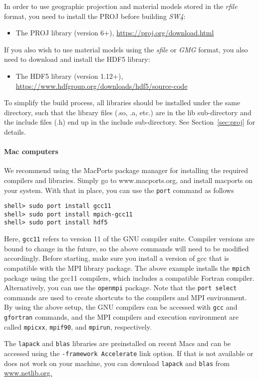 \documentclass[11pt]{article}
\begin{document}
In order to use geographic projection and material models stored in the \emph{rfile} format, you need to install the PROJ before building \emph{SW4}:
\begin{itemize}
\item The PROJ library (version 6+), \url{https://proj.org/download.html}
\end{itemize}  
If you also wish to use material models using the \emph{sfile} or \emph{GMG} format, you also need to download and install the HDF5 library:
\begin{itemize}
\item The HDF5 library (version 1.12+), \url{https://www.hdfgroup.org/downloads/hdf5/source-code}
\end{itemize}
To simplify the build process, all libraries should be installed under the same directory, such that the library files (.so, .a, etc.) are in the lib sub-directory and the include files (.h) end up in the include sub-directory. See Section~\ref{sec:proj} for details.

\paragraph{Mac computers}

We recommend using the MacPorts package manager for installing the required compilers and libraries. Simply go to www.macports.org, and install macports on your system. With that in place, you can use the \verb+port+ command as follows
\begin{verbatim}
shell> sudo port install gcc11
shell> sudo port install mpich-gcc11
shell> sudo port install hdf5
\end{verbatim}
Here, \verb+gcc11+ refers to version 11 of the GNU compiler suite. Compiler versions are bound to change in the future, so the above commands will need to be modified accordingly. Before starting, make sure you install a version of gcc that is compatible with the MPI library package. The above example installs the \verb+mpich+ package using the gcc11 compilers, which includes a compatible Fortran compiler. Alternatively, you can use the \verb+openmpi+ package. Note that the \verb+port select+ commands are used to create shortcuts to the compilers and MPI environment. By using the above setup, the GNU compilers can be accessed with \verb+gcc+ and \verb+gfortran+ commands, and the MPI compilers and execution environment are called \verb+mpicxx+, \verb+mpif90+, and \verb+mpirun+, respectively.

The \verb+lapack+ and \verb+blas+ libraries are preinstalled on recent Macs and can be accessed using the \verb+-framework Accelerate+ link option. If that is not available or does not work on your machine, you can download \verb+lapack+ and \verb+blas+ from \url{www.netlib.org.}
\end{document}

